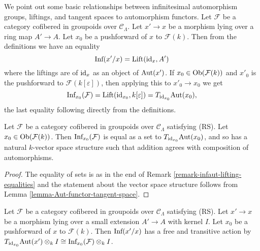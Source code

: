 \begin{remark}
\label{remark-infaut-lifting-equalities}
We point out some basic relationships between infinitesimal automorphism 
groups, liftings, and tangent spaces to automorphism functors.  Let $\mathcal 
F$ be a category cofibered in groupoids over $\mathcal C_{\Lambda}$.  Let $x' 
\rightarrow x$ be a morphism lying over a ring map $A' \rightarrow A$.  Let 
$x_0$ be a pushforward of $x$ to $\mathcal F(k)$.  Then from the definitions we 
have an equality
\[ \textnormal{Inf}(x'/x) = \textnormal{Lift}(\textnormal{id}_{x}, A') \]
where the liftings are of $\textnormal{id}_{x}$ as an object of 
$\textnormal{Aut}(x')$.  If $x_0 \in \textnormal{Ob}(\mathcal F(k))$ and $x'_0$ 
is the pushforward to $\mathcal F(k[\varepsilon])$, then applying this to $x'_0 
\rightarrow x_0$ we get 
\[ \textnormal{Inf}_{x_0}(\mathcal F) = 
\textnormal{Lift}(\textnormal{id}_{x_0}, k[\varepsilon]) = 
T_{\textnormal{id}_{x_0}} \textnormal{Aut}(x_0), \]
the last equality following directly from the definitions.
\end{remark}

\begin{lemma}
\label{lemma-infaut-vector-space}
Let $\mathcal F$ be a category cofibered in groupoids over $\mathcal 
C_{\Lambda}$ satisfying \textnormal{(RS)}.  Let $x_0 \in 
\textnormal{Ob}(\mathcal F(k))$.  Then $\textnormal{Inf}_{x_0}(\mathcal F)$ is 
equal as a set to $T_{\textnormal{id}_{x_0}} \textnormal{Aut}(x_0)$, and so has 
a natural $k$-vector space structure such that addition agrees with composition 
of automorphisms.
\end{lemma}

\begin{proof}
The equality of sets is as in the end of Remark 
\ref{remark-infaut-lifting-equalities} and the statement about the vector space 
structure follows from Lemma \ref{lemma-Aut-functor-tangent-space}.
\end{proof} 

\begin{lemma}
\label{lemma-lifted-automorphisms-torsor}
Let $\mathcal F$ be a category cofibered in groupoids over $\mathcal 
C_{\Lambda}$ satisfying \textnormal{(RS)}.  Let $x' \rightarrow x$ be a 
morphism lying over a small extension $A' \rightarrow A$ with kernel $I$.  Let 
$x_0$ be a pushforward of $x$ to $\mathcal F(k)$.  Then 
$\textnormal{Inf}(x'/x)$ has a free and transitive action by 
$T_{\textnormal{id}_{x_0}} \textnormal{Aut}(x') \otimes_{k} I \cong 
\textnormal{Inf}_{x_0}(\mathcal F) \otimes_{k} I$.
\end{lemma}

